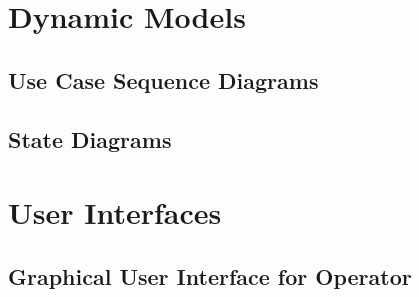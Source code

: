 
\section{Dynamic Models}
%


\subsection{Use Case Sequence Diagrams}


\subsection{State Diagrams}


\section{User Interfaces}



\subsection{Graphical User Interface for Operator}


